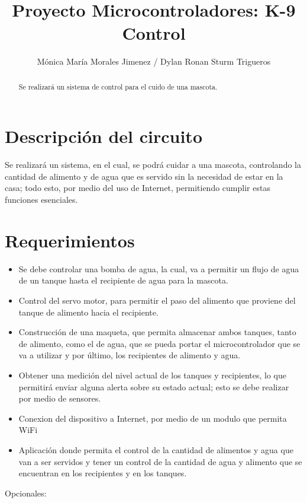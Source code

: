 \documentclass[12pt,letterpaper]{IEEEtran}
\title{Proyecto Microcontroladores: K-9 Control}
\author{Mónica María Morales Jimenez / Dylan Ronan Sturm Trigueros}
\begin{document}
\renewcommand{\leftmark}{UNIVERSIDAD LATINA DE COSTA RICA -- BINGE-61 Microcontroladores}

\maketitle


\begin{abstract}
Se realizará un sistema de control para el cuido de una mascota.
\end{abstract}

\section{Descripción del circuito}

Se realizará un sistema, en el cual, se podrá cuidar a una mascota, controlando la cantidad de alimento y de agua que es servido sin la necesidad de estar en la casa; todo esto, por medio del uso de Internet, permitiendo cumplir estas funciones esenciales. 

\section{Requerimientos}

\begin{itemize}
	\item Se debe controlar una bomba de agua, la cual, va a permitir un flujo de agua de un tanque hasta el recipiente de agua para la mascota.
	\item Control del servo motor, para permitir el paso del alimento que proviene del tanque de alimento hacia el recipiente.
	\item Construcción de una maqueta, que permita almacenar ambos tanques, tanto de alimento, como el de agua, que se pueda portar el microcontrolador que se va a utilizar y por último, los recipientes de alimento y agua.
	\item Obtener una medición del nivel actual de los tanques y recipientes, lo que permitirá enviar alguna alerta sobre su estado actual; esto se debe realizar por medio de sensores.
	\item Conexion del dispositivo a Internet, por medio de un modulo que permita WiFi
	\item Aplicación donde permita el control de la cantidad de alimentos y agua que van a ser servidos y tener un control de la cantidad de agua y alimento que se encuentran en los recipientes y en los tanques. 
\end{itemize}
Opcionales:
\end{document}
